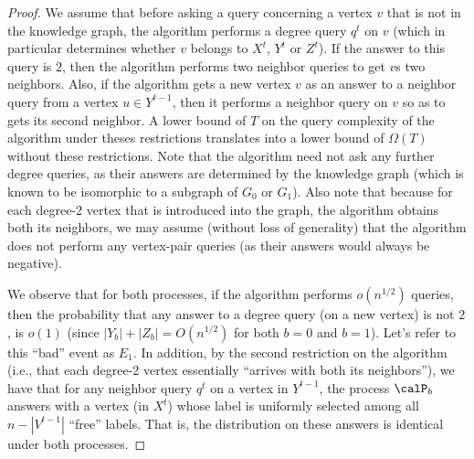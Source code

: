 \begin{proof}
We assume that before asking a query concerning a vertex $v$ that is not in the knowledge graph, the algorithm performs a degree query $q^t$ on $v$ (which in particular determines whether $v$ belongs to $X^t$, $Y^t$ or $Z^t$).
If the answer to this query is $2$, then the algorithm performs two neighbor queries to get $v$s two neighbors.
Also, if the algorithm gets a new vertex $v$ as an answer to a neighbor query from a vertex
$u \in Y^{t-1}$, then it performs a neighbor query on $v$ so as to gets its second neighbor.
A lower bound of $T$ on the query complexity of the algorithm under theses restrictions translates into a lower bound of $\Omega(T)$ without these restrictions. Note that the algorithm need not ask any further degree queries, as their answers are determined by the knowledge graph (which is known to be isomorphic to a subgraph of $G_0$ or $G_1$). Also note that because for each degree-2 vertex that is introduced into the graph, the algorithm obtains both its neighbors, we may assume (without loss of generality) that the algorithm does not perform any vertex-pair queries (as their answers would always be negative).


We observe that for both processes, if the algorithm performs $o(n^{1/2})$ queries, then the probability that any answer to a degree query (on a new vertex) is not $2$, is $o(1)$ (since $|Y_b|+|Z_b| = O(n^{1/2})$ for both $b=0$ and $b=1$). Let's refer to this ``bad'' event as $E_1$.
In addition, by the second restriction on the algorithm (i.e., that each degree-2 vertex essentially ``arrives with both its neighbors''), we have that for any neighbor query $q^t$ on a vertex in $Y^{t-1}$, the process $\calP_b$ answers with a vertex (in $X^t$) whose label is uniformly selected among all $n-|V^{t-1}|$ ``free'' labels. That is, the distribution on these answers is identical under both processes.





\end{proof}
